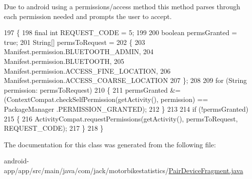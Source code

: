 Due to android using a permissions/access method this method parses through each permission needed and prompts the user to accept. 
\begin{DoxyCode}
197     \{
198         \textcolor{keyword}{final} \textcolor{keywordtype}{int} REQUEST\_CODE = 5;
199 
200         \textcolor{keywordtype}{boolean} permsGranted = \textcolor{keyword}{true};
201         String[] permsToRequest =
202                 \{
203                         Manifest.permission.BLUETOOTH\_ADMIN,
204                         Manifest.permission.BLUETOOTH,
205                         Manifest.permission.ACCESS\_FINE\_LOCATION,
206                         Manifest.permission.ACCESS\_COARSE\_LOCATION
207                 \};
208 
209         \textcolor{keywordflow}{for} (String permission: permsToRequest)
210         \{
211             permsGranted &= (ContextCompat.checkSelfPermission(getActivity(), permission) == PackageManager
      .PERMISSION\_GRANTED);
212         \}
213 
214         \textcolor{keywordflow}{if} (!permsGranted)
215         \{
216             ActivityCompat.requestPermissions(getActivity(), permsToRequest, REQUEST\_CODE);
217         \}
218     \}
\end{DoxyCode}


The documentation for this class was generated from the following file\+:\begin{DoxyCompactItemize}
\item 
android-\/app/app/src/main/java/com/jack/motorbikestatistics/\hyperlink{_pair_device_fragment_8java}{Pair\+Device\+Fragment.\+java}\end{DoxyCompactItemize}
